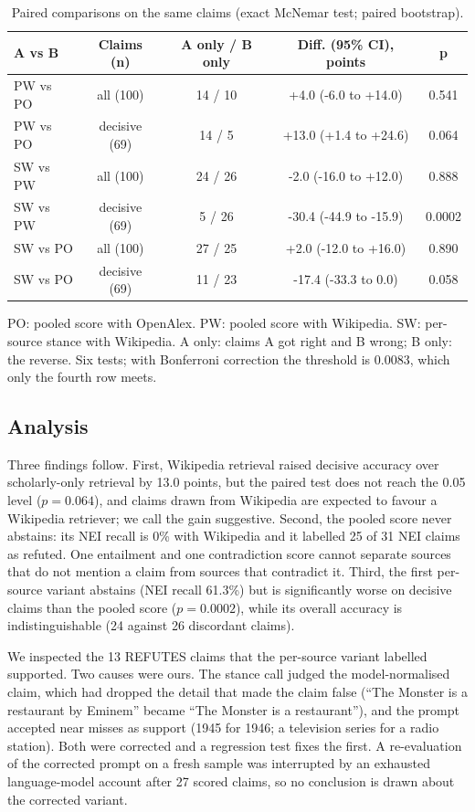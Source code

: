 \documentclass[11pt,a4paper]{article}
\begin{document}
\begin{table}[t]
\centering\footnotesize
\begin{tabular}{lcccc}
\toprule
A vs B & Claims (n) & A only / B only & Diff. (95\% CI), points & p \\
\midrule
PW vs PO & all (100) & 14 / 10 & +4.0 (-6.0 to +14.0) & 0.541 \\
PW vs PO & decisive (69) & 14 / 5 & +13.0 (+1.4 to +24.6) & 0.064 \\
SW vs PW & all (100) & 24 / 26 & -2.0 (-16.0 to +12.0) & 0.888 \\
SW vs PW & decisive (69) & 5 / 26 & -30.4 (-44.9 to -15.9) & 0.0002 \\
SW vs PO & all (100) & 27 / 25 & +2.0 (-12.0 to +16.0) & 0.890 \\
SW vs PO & decisive (69) & 11 / 23 & -17.4 (-33.3 to 0.0) & 0.058 \\
\bottomrule
\end{tabular}
\caption{Paired comparisons on the same claims (exact McNemar test; paired bootstrap).}
\par{\scriptsize PO: pooled score with OpenAlex. PW: pooled score with Wikipedia. SW: per-source stance with Wikipedia. A only: claims A got right and B wrong; B only: the reverse. Six tests; with Bonferroni correction the threshold is 0.0083, which only the fourth row meets.}
\end{table}

\subsection{Analysis}

Three findings follow. First, Wikipedia retrieval raised decisive accuracy over scholarly-only retrieval by 13.0 points, but the paired test does not reach the 0.05 level ($p = 0.064$), and claims drawn from Wikipedia are expected to favour a Wikipedia retriever; we call the gain suggestive. Second, the pooled score never abstains: its NEI recall is 0\% with Wikipedia and it labelled 25 of 31 NEI claims as refuted. One entailment and one contradiction score cannot separate sources that do not mention a claim from sources that contradict it. Third, the first per-source variant abstains (NEI recall 61.3\%) but is significantly worse on decisive claims than the pooled score ($p = 0.0002$), while its overall accuracy is indistinguishable (24 against 26 discordant claims).

We inspected the 13 REFUTES claims that the per-source variant labelled supported. Two causes were ours. The stance call judged the model-normalised claim, which had dropped the detail that made the claim false (``The Monster is a restaurant by Eminem'' became ``The Monster is a restaurant''), and the prompt accepted near misses as support (1945 for 1946; a television series for a radio station). Both were corrected and a regression test fixes the first. A re-evaluation of the corrected prompt on a fresh sample was interrupted by an exhausted language-model account after 27 scored claims, so no conclusion is drawn about the corrected variant.
\end{document}
